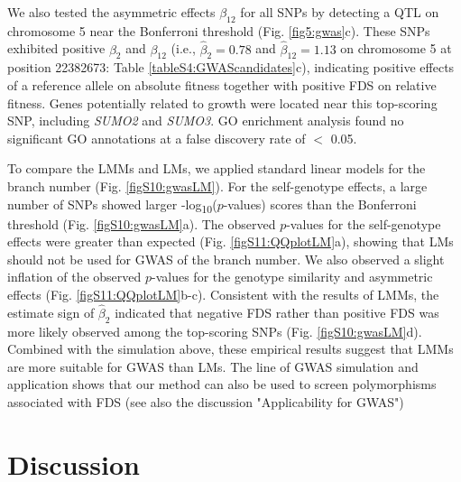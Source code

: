 \documentclass[12pt,]{article}
\begin{document}
We also tested the asymmetric effects $\beta_{12}$ for all SNPs by detecting a QTL on chromosome 5 near the Bonferroni threshold (Fig. \ref{fig5:gwas}c). These SNPs exhibited positive $\beta_2$ and $\beta_{12}$ (i.e., $\hat{\beta}_2=0.78$ and $\hat{\beta}_{12}=1.13$ on chromosome 5 at position 22382673: Table \ref{tableS4:GWAScandidates}c), indicating positive effects of a reference allele on absolute fitness together with positive FDS on relative fitness. Genes potentially related to growth were located near this top-scoring SNP, including \textit{SUMO2} and \textit{SUMO3}. GO enrichment analysis found no significant GO annotations at a false discovery rate of $<$ 0.05.

To compare the LMMs and LMs, we applied standard linear models for the branch number (Fig. \ref{figS10:gwasLM}). For the self-genotype effects, a large number of SNPs showed larger -log\textsubscript{10}($p$-values) scores than the Bonferroni threshold (Fig. \ref{figS10:gwasLM}a). The observed $p$-values for the self-genotype effects were greater than expected (Fig. \ref{figS11:QQplotLM}a), showing that LMs should not be used for GWAS of the branch number. We also observed a slight inflation of the observed $p$-values for the genotype similarity and asymmetric effects (Fig. \ref{figS11:QQplotLM}b-c). Consistent with the results of LMMs, the estimate sign of $\hat{\beta}_2$ indicated that negative FDS rather than positive FDS was more likely observed among the top-scoring SNPs (Fig. \ref{figS10:gwasLM}d). Combined with the simulation above, these empirical results suggest that LMMs are more suitable for GWAS than LMs. The line of GWAS simulation and application shows that our method can also be used to screen polymorphisms associated with FDS (see also the discussion "Applicability for GWAS")


\section{Discussion}
\end{document}
